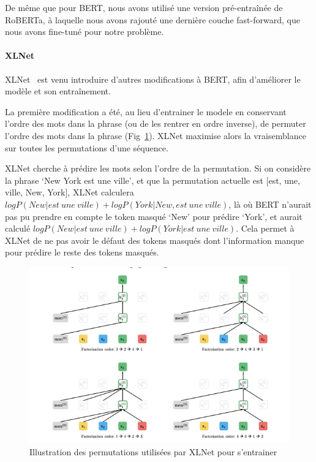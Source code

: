 \documentclass[11pt,a4paper, french]{article}
\begin{document}
De même que pour BERT, nous avons utilisé une version pré-entraînée de RoBERTa, à laquelle nous avons rajouté une dernière couche fast-forward, que nous avons fine-tuné pour notre problème.


\paragraph{XLNet}

XLNet~\cite{yang2019xlnet} est venu introduire d'autres modifications à BERT, afin d'améliorer le modèle et son entraînement.

La première modification a été, au lieu d'entrainer le modele en conservant l'ordre des mots dans la phrase (ou de les rentrer en ordre inverse), de permuter l'ordre des mots dans la phrase (Fig~\ref{fig:XLNet:permutations}). XLNet maximise alors la vraisemblance sur toutes les permutations d'une séquence.

XLNet cherche à prédire les mots selon l'ordre de la permutation. Si on considère la phrase `New York est une ville', et que la permutation actuelle est [est, une, ville, New, York], XLNet calculera $log P(New | est~une~ville) + log P(York | New, est~une~ville)$, là où BERT n'aurait pas pu prendre en compte le token masqué `New' pour prédire `York', et aurait calculé  $log P(New | est~une~ville) + log P(York | est~une~ville)$. Cela permet à XLNet de ne pas avoir le défaut des tokens masqués dont l'information manque pour prédire le reste des tokens masqués.


\begin{figure}
  \includegraphics[width=\linewidth]{resources/xlnet-permutations.png}
  \caption{Illustration des permutations utilisées par XLNet pour s'entrainer}
  \label{fig:XLNet:permutations}
\end{figure}
\end{document}

